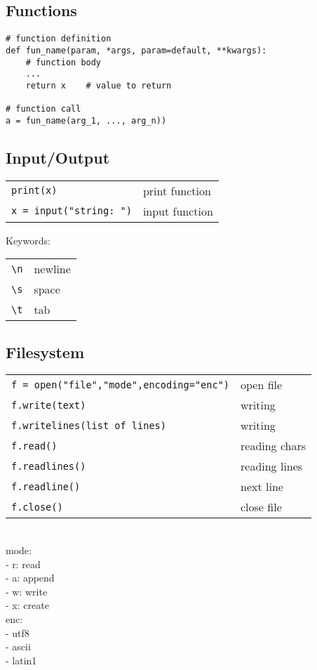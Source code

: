     


\subsection{Functions}

\begin{verbatim}
# function definition
def fun_name(param, *args, param=default, **kwargs):
    # function body
    ...
    return x    # value to return

# function call
a = fun_name(arg_1, ..., arg_n))
\end{verbatim}





\subsection{Input/Output}

\begin{tabular}{@{}ll@{}}
    \verb!print(x)!    & print function \\
    \verb!x = input("string: ")!    & input function \\
\end{tabular}

Keywords:
\begin{tabular}{@{}ll@{}}
    \verb!\n!    & newline \\
    \verb!\s!    & space \\
    \verb!\t!    & tab \\
\end{tabular}










\subsection{Filesystem}

\begin{tabular}{@{}ll@{}}
    \verb!f = open("file","mode",encoding="enc")!    & open file \\
    \verb!f.write(text)!    & writing \\
    \verb!f.writelines(list of lines)!    & writing \\
    \verb!f.read()!    & reading chars \\
    \verb!f.readlines()!    & reading lines \\
    \verb!f.readline()!    & next line \\
    \verb!f.close()!    & close file \\
\end{tabular}\\
mode: \\
- r: read \\
- a: append \\
- w: write \\
- x: create \\
enc: \\
- utf8 \\
- ascii \\
- latin1 \\


